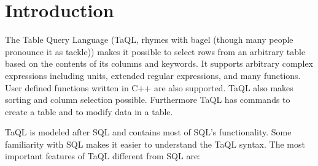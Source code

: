 

\section{Introduction}
The Table Query Language (TaQL, rhymes with bagel (though many people
pronounce it as tackle)) makes it possible to select
rows from an arbitrary table based on the contents of its
columns and keywords. It supports arbitrary complex
expressions including units, extended regular expressions, and many
functions. User defined functions written in C++ are also supported.
TaQL also makes sorting and column selection possible.
Furthermore TaQL has commands to create a table and to modify data
in a table.

TaQL is modeled after SQL and contains most of SQL's
functionality. Some familiarity with SQL makes it easier to understand
the TaQL syntax.
The most important features of TaQL different from SQL are:
